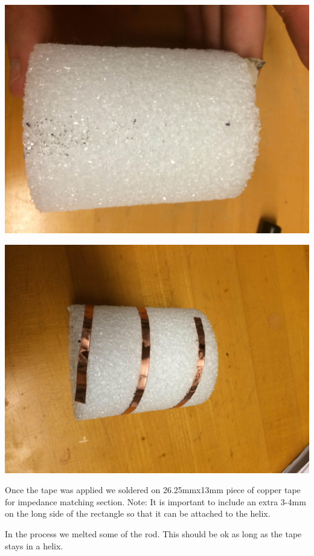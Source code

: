 \documentclass[11pt]{article} %
\begin{document}
\begin{center}
\includegraphics[scale=0.08]{feed/10.jpeg}
\end{center}

\begin{center}
\includegraphics[scale=0.08]{feed/11.jpeg}
\end{center}


Once the tape was applied we soldered on 26.25mmx13mm piece of copper tape for impedance matching section. Note: It is important to include an extra 3-4mm on the long side of the rectangle so that it can be attached to the helix. 


In the process we melted some of the rod. This should be ok as long as the tape stays in a helix. 
\end{document}
